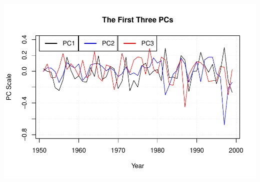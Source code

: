 \documentclass[
]{article}
\begin{document}
\includegraphics{Assignment3_files/figure-latex/unnamed-chunk-2-4.pdf}
\end{document}
